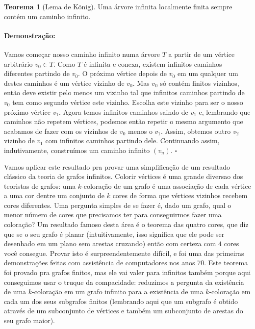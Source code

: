 \documentclass[11pt]{article}
\newcommand{\pulinho}{\vspace{.5cm}}
\theoremstyle{definition}
\newtheorem{theorem}{Teorema}
\newenvironment{teorema}{
\definecolor{shadecolor}{HTML}{f59aa3}
\begin{shaded}
\begin{theorem}
}
{
\end{theorem}
\end{shaded}
}
\theoremstyle{definition}
\theoremstyle{definition}
\theoremstyle{definition}
\theoremstyle{definition}
\theoremstyle{definition}
\theoremstyle{definition}
\theoremstyle{definition}
\theoremstyle{definition}
\theoremstyle{definition}
\theoremstyle{definition}
\theoremstyle{definition}
\newenvironment{prova}{\paragraph{Demonstração:}}{\hfill$\square$ 
\pulinho
}
\theoremstyle{definition}
\begin{document}
\begin{teorema}[Lema de König]
 Uma árvore infinita localmente finita sempre contém um caminho infinito.
\end{teorema}
\begin{prova}
  Vamos começar nosso caminho infinito numa árvore $T$ a partir de um vértice arbitrário $v_0 \in T$. Como $T$ é infinita e conexa, existem infinitos caminhos diferentes partindo de $v_0$. O próximo vértice depois de $v_0$ em um qualquer um destes caminhos é um vértice vizinho de $v_0$. Mas $v_0$ só contém finitos vizinhos, então deve existir pelo menos um vizinho tal que infinitos caminhos partindo de $v_0$ tem como segundo vértice este vizinho. Escolha este vizinho para ser o nosso próximo vértice $v_1$. Agora temos infinitos caminhos saindo de $v_1$ e, lembrando que caminhos não repetem vértices, podemos então repetir o mesmo argumento que acabamos de fazer com os vizinhos de $v_0$ menos o $v_1$. Assim, obtemos outro $v_2$ vizinho de $v_1$ com infinitos caminhos partindo dele. Continuando assim, indutivamente, construímos um caminho infinito $(v_n)$.
\end{prova}

Vamos aplicar este resultado pra provar uma simplificação de um resultado clássico da teoria de grafos infinitos. Colorir vértices é uma grande diversao dos teoristas de grafos: uma $k$-coloração de um grafo é uma associação de cada vértice a uma cor dentre um conjunto de $k$ cores de forma que vértices vizinhos recebem cores diferentes. Uma pergunta simples de se fazer é, dado um grafo, qual o menor número de cores que precisamos ter para conseguirmos fazer uma coloração? Um resultado famoso desta área é o teorema das quatro cores, que diz que se o seu grafo é planar (intuitivamente, isso significa que ele pode ser desenhado em um plano sem arestas cruzando) então com certeza com $4$ cores você consegue. Provar isto é surpreendentemente difícil, e foi uma das primeiras demonstrações feitas com assistência de computadores nos anos 70. Este teorema foi provado pra grafos finitos, mas ele vai valer para infinitos também porque aqui conseguimos usar o truque da compacidade: reduzimos a pergunta da existência de uma $k$-coloração em um grafo infinito para a existência de uma $k$-coloração em cada um dos seus subgrafos finitos (lembrando aqui que um subgrafo é obtido através de um subconjunto de vértices e também um subconjunto de arestas do seu grafo maior).
\end{document}
